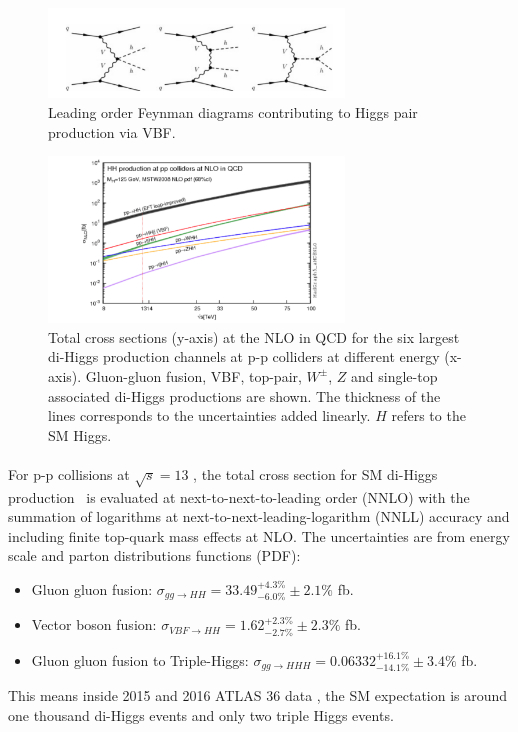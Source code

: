 \begin{figure}[h!]
  \centering
  \captionsetup{justification=centering}
  \includegraphics[width=0.7\textwidth]{figures/theory/SM_HH_VBF}
  \caption{Leading order Feynman diagrams contributing to Higgs pair production via VBF.}
  \label{fig:SM_HH_VBF}
\end{figure}

\begin{figure}[h!]
  \centering
  \captionsetup{justification=centering}
  \includegraphics[width=0.7\textwidth]{figures/theory/HH_xsec}
  \caption{Total cross sections (y-axis) at the NLO in QCD for the six largest di-Higgs production channels at p-p colliders at different energy (x-axis). Gluon-gluon fusion, VBF, top-pair, $W^{\pm}$, $Z$ and single-top associated di-Higgs productions are shown. The thickness of the lines corresponds to the uncertainties added linearly. $H$ refers to the SM Higgs.}
  \label{fig:SM_HH_xsec}
\end{figure}

\paragraph{}
\label{par:diHiggs-crosssection}
For p-p collisions at $\sqrt{s}=13$ \TeV, the total cross section for SM di-Higgs production~\cite{LHCYellow} is evaluated at next-to-next-to-leading order (NNLO) with the summation of logarithms at next-to-next-leading-logarithm (NNLL) accuracy and including finite top-quark mass effects at NLO. 
The uncertainties are from energy scale and parton distributions functions (PDF):
\begin{itemize}
  \item Gluon gluon fusion: $\sigma_{gg \to HH} = 33.49^{+ 4.3 \%}_{-6.0 \%} \pm 2.1\%$ fb. %
  \item Vector boson fusion: $\sigma_{VBF \to HH} = 1.62^{+ 2.3 \%}_{-2.7 \%} \pm 2.3\%$ fb.
  \item Gluon gluon fusion to Triple-Higgs: $\sigma_{gg \to HHH} = 0.06332 ^{+ 16.1 \%}_{-14.1 \%} \pm 3.4\% $ fb.
\end{itemize} 
This means inside 2015 and 2016 ATLAS 36 \ifb data , the SM expectation is around one thousand di-Higgs events and only two triple Higgs events.



